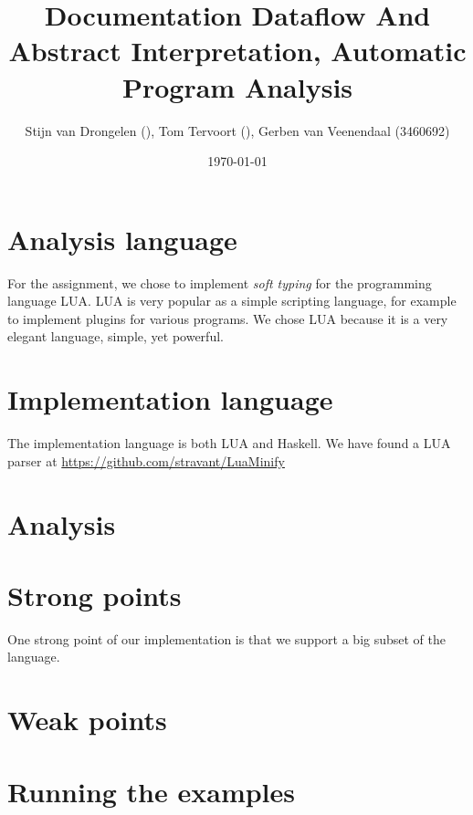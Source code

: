 \documentclass[a4paper]{article}
\title{Documentation Dataflow And Abstract Interpretation, Automatic Program Analysis}
\author{Stijn van Drongelen (), Tom Tervoort (), Gerben van Veenendaal (3460692)}
\date{\today}
\begin{document}
\maketitle

\section*{Analysis language}

For the assignment, we chose to implement \textit{soft typing} for the programming language LUA. LUA is very popular as a simple scripting language, for example to implement plugins for various programs. We chose LUA because it is a very elegant language, simple, yet powerful.

\section*{Implementation language}

The implementation language is both LUA and Haskell. We have found a LUA parser at \url{https://github.com/stravant/LuaMinify}

\section*{Analysis}




\section*{Strong points}

One strong point of our implementation is that we support a big subset of the language.


\section*{Weak points}

\section*{Running the examples}
\end{document}
